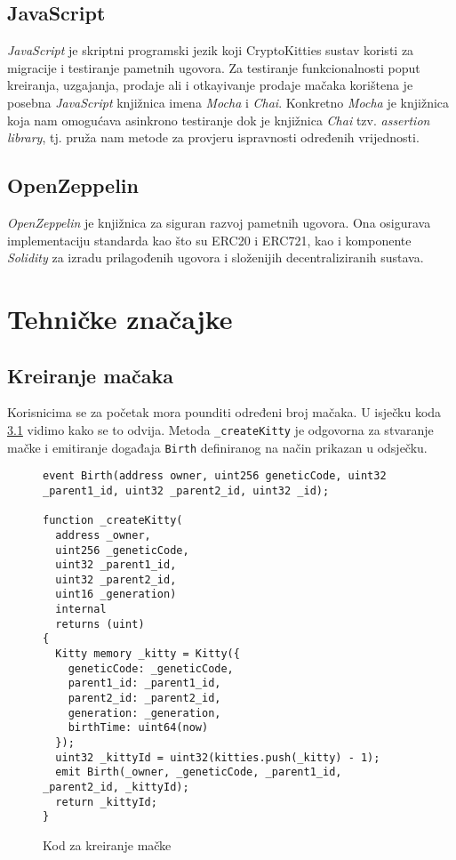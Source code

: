 \documentclass[times, utf8, tehnicka_dokumentacija]{fer}
\begin{document}
\section{JavaScript}
{\it JavaScript} je skriptni programski jezik koji CryptoKitties sustav koristi za migracije i testiranje pametnih
ugovora. Za testiranje funkcionalnosti poput kreiranja, uzgajanja, prodaje ali i otkayivanje prodaje mačaka korištena
je posebna {\it JavaScript} knjižnica imena {\it Mocha} i {\it Chai}. Konkretno {\it Mocha} je knjižnica koja nam
omogućava asinkrono testiranje dok je knjižnica {\it Chai} tzv. {\it assertion library}, tj. pruža nam metode za
provjeru ispravnosti određenih vrijednosti.

\section{OpenZeppelin}
{\it OpenZeppelin} je knjižnica za siguran razvoj pametnih ugovora. Ona osigurava implementaciju standarda kao što su
ERC20 i ERC721, kao i komponente {\it Solidity} za izradu prilagođenih ugovora i složenijih decentraliziranih sustava.

\chapter{Tehničke značajke}

\section{Kreiranje mačaka}
Korisnicima se za početak mora pounditi određeni broj mačaka. U isječku koda \ref{lst:createkitty} vidimo kako se to
odvija. Metoda \lstinline|_createKitty| je odgovorna za stvaranje mačke i emitiranje događaja \lstinline|Birth|
definiranog na način prikazan u odsječku.

\begin{figure}
\begin{lstlisting}
event Birth(address owner, uint256 geneticCode, uint32 _parent1_id, uint32 _parent2_id, uint32 _id);

function _createKitty(
  address _owner,
  uint256 _geneticCode,
  uint32 _parent1_id,
  uint32 _parent2_id,
  uint16 _generation)
  internal
  returns (uint)
{
  Kitty memory _kitty = Kitty({
    geneticCode: _geneticCode,
    parent1_id: _parent1_id,
    parent2_id: _parent2_id,
    generation: _generation,
    birthTime: uint64(now)
  });
  uint32 _kittyId = uint32(kitties.push(_kitty) - 1);
  emit Birth(_owner, _geneticCode, _parent1_id, _parent2_id, _kittyId);
  return _kittyId;
}
\end{lstlisting}
\caption{Kod za kreiranje mačke}
\label{lst:createkitty}
\end{figure}
\end{document}

